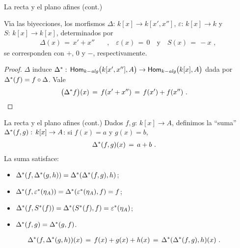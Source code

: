 \begin{frame}{La recta y el plano afines (cont.)}
	\begin{propoRectaAfin}\label{propo:rectaafin}
		V\'{\i}a las biyecciones, los morfismos
		$\Delta:\,k[x]\rightarrow k[x',x'']$,
		$\varepsilon:\,k[x]\rightarrow k$ y $S:\,k[x]\rightarrow k[x]$,
		determinados por
		\begin{align*}
			\Delta(x) \,=\,x'+x'' & \quad\text{,}\quad
				\varepsilon(x)\,=\,0 \quad\text{y}\quad
				S(x)\,=\,-x
			\text{ ,}
		\end{align*}
		se corresponden con $+$, $0$ y $-$, respectivamente.
	\end{propoRectaAfin}
	\begin{proof}
		$\Delta$ induce
		\begin{math}
			{\Delta}^{*}:\,\mathsf{Hom}_{k-\mathit{alg}}\big(k[x',x''],A\big)\rightarrow
				\mathsf{Hom}_{k-\mathit{alg}}\big(k[x],A\big)
		\end{math} dada por ${\Delta}^{*}(f)=f\circ\Delta$. Vale
		\begin{align*}
			\big({\Delta}^{*} f\big)(x) & \,=\,f(x'+x'')\,=\,
				f(x')+f(x'')
			\text{ .}
		\end{align*}
	\end{proof}
\end{frame}

\begin{frame}{La recta y el plano afines (cont.)}
	Dados $f,g:\,k[x]\rightarrow A$, definimos la ``suma''
	${\Delta}^{*}(f,g):\,k[x]\rightarrow A$: si $f(x)=a$ y $g(x)=b$,
	\begin{align*}
		{\Delta}^{*}(f,g)(x) & \,=\,a+b
		\text{ .}
	\end{align*}
	La suma satisface:
	\begin{itemize}
		\item
			\begin{math}
				{\Delta}^{*}(f,{\Delta}^{*}(g,h))=
					{\Delta}^{*}({\Delta}^{*}(f,g),h)
			\end{math};
		\item
			\begin{math}
				{\Delta}^{*}(f,{\varepsilon}^{*}(\eta_A))=
					{\Delta}^{*}({\varepsilon}^{*}(\eta_A),f)
					=f
			\end{math};
		\item
			\begin{math}
				{\Delta}^{*}(f,{S}^{*}(f))=
					{\Delta}^{*}({S}^{*}(f),f)=
					{\varepsilon}^{*}(\eta_A)
			\end{math};
		\item
			\begin{math}
				{\Delta}^{*}(f,g)={\Delta}^{*}(g,f)
			\end{math}.
	\end{itemize}
	\begin{align*}
		{\Delta}^{*}(f,{\Delta}^{*}(g,h))(x) & \,=\,
			f(x)+g(x)+h(x)\,=\,
			{\Delta}^{*}({\Delta}^{*}(f,g),h)(x)
		\text{ .}
	\end{align*}
\end{frame}

